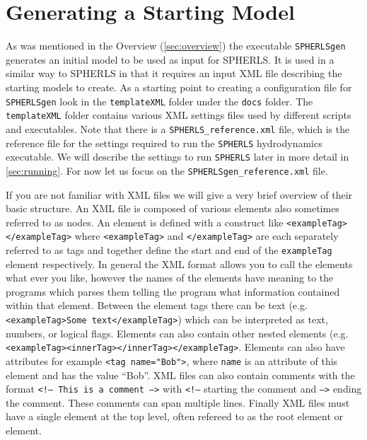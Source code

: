 \documentclass[12pt,a4paper]{book}
\begin{document}
\section{Generating a Starting Model}
As was mentioned in the Overview (\autoref{sec:overview}) the executable {\tt SPHERLSgen} generates an initial model to be used as input for SPHERLS. It is used in a similar way to SPHERLS in that it requires an input XML file describing the starting models to create. As a starting point to creating a configuration file for {\tt SPHERLSgen} look in the {\tt templateXML} folder under the {\tt docs} folder. The {\tt templateXML} folder contains various XML settings files used by different scripts and executables. Note that there is a {\tt SPHERLS\_reference.xml} file, which is the reference file for the settings required to run the {\tt SPHERLS} hydrodynamics executable. We will describe the settings to run {\tt SPHERLS} later in more detail in \autoref{sec:running}. For now let us focus on the {\tt SPHERLSgen\_reference.xml} file.

If you are not familiar with XML files we will give a very brief overview of their basic structure. An XML file is composed of various elements also sometimes referred to as nodes. An element is defined with a construct like {\tt <exampleTag> </exampleTag>} where {\tt <exampleTag>} and {\tt </exampleTag>} are each separately referred to as tags and together define the start and end of the {\tt exampleTag} element respectively. In general the XML format allows you to call the elements what ever you like, however the names of the elements have meaning to the programs which parses them telling the program what information contained within that element. Between the element tags there can be text (e.g. {\tt <exampleTag>Some text</exampleTag>}) which can be interpreted as text, numbers, or logical flags. Elements can also contain other nested elements (e.g. {\tt <exampleTag><innerTag></innerTag></exampleTag>}. Elements can also have attributes for example {\tt <tag name="Bob">}, where {\tt name} is an attribute of this element and has the value ``Bob''. XML files can also contain comments with the format {\tt <!-- This is a comment -->} with {\tt <!--} starting the comment and {\tt -->} ending the comment. These comments can span multiple lines. Finally XML files must have a single element at the top level, often refereed to as the root element or element.
\end{document}
